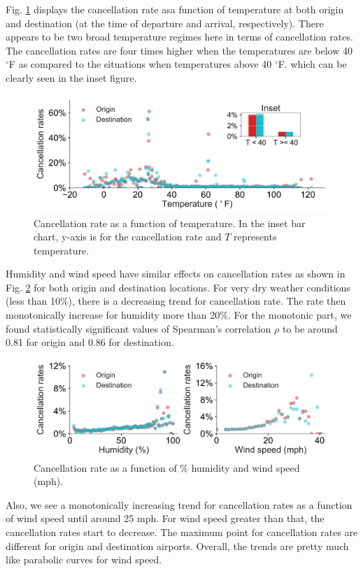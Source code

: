 \documentclass[12pt]{article}
\begin{document}
Fig. \ref{fig:tempcanrate} displays the cancellation rate asa function of temperature at both origin and destination (at the time of departure and arrival, respectively). There appears to be two broad temperature regimes here in terms of cancellation rates. The cancellation rates are four times higher when the temperatures are below 40 $^\circ$F as compared to the situations when temperatures above 40 $^\circ$F. which can be clearly seen in the inset figure. 
\begin{figure}[h!]
\begin{center}
\includegraphics[width=6in]{temperature_canrate.pdf}
\end{center}
\caption{\label{fig:tempcanrate}
Cancellation rate as a function of temperature. In the inset bar chart, y-axis is for the cancellation rate and $T$ represents temperature.}
\end{figure}
Humidity and wind speed have similar effects on cancellation rates as shown in Fig. \ref{fig:humwindcanrate} for both origin and destination locations. For very dry weather conditions (less than 10$\%$), there is a decreasing trend for cancellation rate. The rate then monotonically increase for humidity more than 20$\%$. For the monotonic part, we found statistically significant values of Spearman's correlation $\rho$ to be around 0.81 for origin and 0.86 for destination. 
\begin{figure}[h!]
\begin{center}
\includegraphics[width=6in]{humidity_windspeed_canrate.pdf}
\end{center}
\caption{\label{fig:humwindcanrate}
Cancellation rate as a function of $\%$ humidity and wind speed (mph).}
\end{figure}
Also, we see a monotonically increasing trend for cancellation rates as a function of wind speed until around 25 mph. For wind speed greater than that, the cancellation rates start to decrease. The maximum point for cancellation rates are different for origin and destination airports. Overall, the trends are pretty much like parabolic curves for wind speed.
\end{document}
